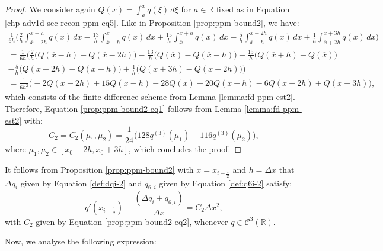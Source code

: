 \begin{proof}
	We consider again $Q(x) = \int_{a}^{x} q(\xi) \,d\xi$ for $a \in \mathbb{R}$ fixed as in 
	Equation \eqref{chp-adv1d-sec-recon-ppm-eq5}. 
	Like in Proposition \ref{prop:ppm-bound2}, we have:
	\begin{align*}
		\frac{1}{6h}
		\bigg( \frac{2}{h} \int_{\overline{x}-2h}^{\overline{x}-h} q(x) \,dx 
		-\frac{13}{h}\int_{\overline{x}-h}^{\overline{x}} q(x) \,dx   
		+\frac{15}{h}\int_{\overline{x}}^{\overline{x}+h} q(x) \,dx 
		-\frac{5}{h} \int_{\overline{x}+h}^{\overline{x}+2h} q(x) \,dx   
		+\frac{1}{h} \int_{\overline{x}+2h}^{\overline{x}+3h} q(x) \,dx   
		\bigg)\\
		= \frac{1}{6h} \bigg(
		\frac{2}{h}   \big( Q(\overline{x}-h)- Q(\overline{x}-2h)\big) 
		-\frac{13}{h} \big( Q(\overline{x}) - Q(\overline{x}-h) \big) 
		+\frac{15}{h} \big( Q(\overline{x}+h) - Q(\overline{x})  \big) \\
		-\frac{5}{h}  \big( Q(\overline{x}+2h) - Q(\overline{x}+h)  \big) 
		+\frac{1}{h}  \big( Q(\overline{x}+3h) - Q(\overline{x}+2h)  \big) 
		\bigg)\\
		= \frac{1}{6h^2}\bigg(-2Q(\overline{x}-2h) + 15Q(\overline{x}-h) - 28Q(\overline{x}) 
		+20Q(\overline{x}+h) -6Q(\overline{x}+2h) + Q(\overline{x}+3h)  \bigg),
	\end{align*}
	which consists of the finite-difference scheme from Lemma \ref{lemma:fd-ppm-est2}. 
	Therefore, Equation \eqref{prop:ppm-bound2-eq1} follows from Lemma \ref{lemma:fd-ppm-est2} with:
	\begin{equation}
		\label{prop:ppm-bound2-eq2}
		C_2 = C_2(\mu_1,\mu_2) = \frac{1}{24}\bigg(128q^{(3)}(\mu_{1}) - 116q^{(3)}(\mu_{2})\bigg), 
	\end{equation}
	where $\mu_{1}, \mu_{2} \in [x_0-2h,x_0+3h]$, which concludes the proof.
\end{proof}
\begin{corollary}
	\label{prop:ppm-bound2-corollary}
	It follows from Proposition \ref{prop:ppm-bound2} with $\overline{x} = x_{i-\frac{1}{2}}$
	and $h = \Delta x$ that $\Delta q_i$ given by Equation \eqref{def:dqi-2} 
	and $q_{6,i}$ given by Equation \eqref{def:q6i-2} satisfy:
	\begin{equation}
		q'(x_{i-\frac{1}{2}})-\frac{(\Delta q_i + q_{6, i})}{\Delta x}  = C_2\Delta x^2,
	\end{equation}
	with $C_2$ given by Equation \eqref{prop:ppm-bound2-eq2}, whenever $q \in \mathcal{C}^3(\mathbb{R})$.
\end{corollary}
Now, we analyse the following expression:
